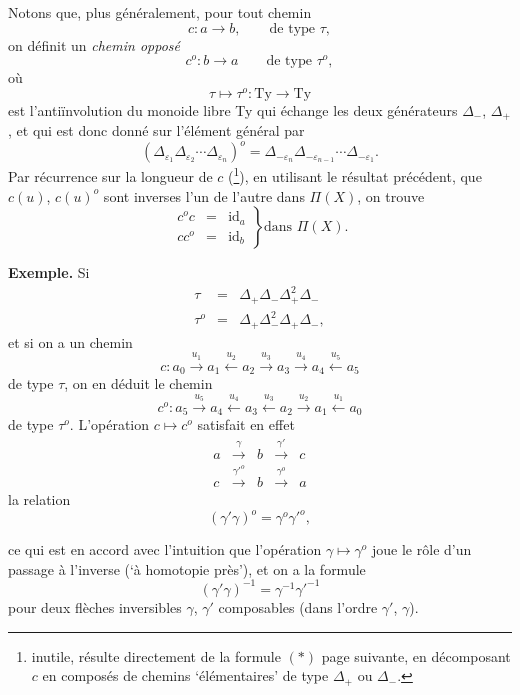 \documentclass[11pt]{article}
\newcommand{\printedpage}[1]{\marginpar{\footnotesize p.~#1}}
\newcommand{\msp}[1]{\marginpar{\vspace*{10pt}\footnotesize [#1]}}
\begin{document}
\printedpage{43}
\msp{page 64}
Notons que, plus généralement, pour tout chemin
\[
c : a \longrightarrow b, \qquad \text{de type } \tau,
\]
on définit un \textit{chemin opposé}
\[
c^o : b \longrightarrow a \qquad \text{de type } \tau^o,
\]
où
\[
\tau \longmapsto \tau^o : \mathrm{Ty} \longrightarrow \mathrm{Ty}
\]
est l'antiïnvolution du monoide libre Ty qui échange les deux générateurs $\Delta_-$, $\Delta_+$, et qui est donc donné sur l'élément général par
\[
(\Delta_{\varepsilon_1}\Delta_{\varepsilon_2}\cdots\Delta_{\varepsilon_n})^o = \Delta_{-\varepsilon_n}\Delta_{-\varepsilon_{n-1}}\cdots\Delta_{-\varepsilon_1}.
\]
Par récurrence sur la longueur de $c$ (\footnote[18]{inutile, résulte directement de la formule $(*)$ page suivante, en décomposant $c$ en composés de chemins `élémentaires' de type $\Delta_+$ ou $\Delta_-$.}), en utilisant le résultat précédent, que $c(u)$, $c(u)^o$ sont inverses l'un de l'autre dans $\Pi(X)$, on trouve
\[
\left.
\begin{array}{rcl}
c^o c & = & \mathrm{id}_a\\
c c^o & = & \mathrm{id}_b
\end{array}
\right\}\text{dans } \Pi(X).
\]

\textbf{Exemple.} Si
\[
\begin{array}{rcl}
\tau & = & \Delta_+\Delta_-\Delta_+^2\Delta_-\\
\tau^o & = & \Delta_+\Delta_-^2\Delta_+\Delta_-,
\end{array}
\]
et si on a un chemin
\[
c : a_0 \xrightarrow{u_1} a_1 \xleftarrow{u_2} a_2 \xrightarrow{u_3} a_3 \xrightarrow{u_4} a_4 \xleftarrow{u_5} a_5
\]
de type $\tau$, on en déduit le chemin
\[
c^o : a_5 \xrightarrow{u_5} a_4 \xleftarrow{u_4} a_3 \xleftarrow{u_3} a_2 \xrightarrow{u_2} a_1 \xleftarrow{u_1} a_0
\]
de type $\tau^o$. L'opération $c \longmapsto c^o$ satisfait en
\msp{page 65}
effet
\[
\begin{array}{ccccc}
a & \xrightarrow{\gamma} & b & \xrightarrow{\gamma'} & c\\
c & \xrightarrow{\gamma'^o} & b & \xrightarrow{\gamma^o} & a
\end{array}
\]
la relation
\[
(\gamma'\gamma)^o = \gamma^o\gamma'^o, \tag*{$(*)$}
\]

\printedpage{44}

ce qui est en accord avec l'intuition que l'opération $\gamma \longmapsto \gamma^o$ joue le rôle d'un passage à l'inverse (`à homotopie près'), et on a la formule
\[
(\gamma'\gamma)^{-1} = \gamma^{-1}\gamma'^{-1}
\]
pour deux flèches inversibles $\gamma$, $\gamma'$ composables (dans l'ordre $\gamma'$, $\gamma$).
\end{document}
